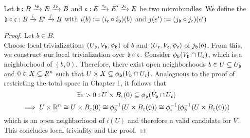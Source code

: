  \\
Let $\bundledef{\bb}{B}{E}{i_\bb}{j_\bb}$ and $\bundledef{\bc}{E}{E'}{i_\bc}{j_\bc}$ be two microbundles.
We define the  $\bundledef{\bb \circ \bc}{B}{E'}{i}{j}$ with
$i(b) := (i_\bc \circ i_\bb)(b)$ and $j(e') := (j_\bb \circ j_\bc)(e')$
\begin{proof}
Let $b \in B$. \\
Choose local trivializations $(U_\bb, V_\bb, \phi_\bb)$ of $b$ and $(U_\bc, V_\bc, \phi_\bc)$ of $j_\bb(b)$.
From this, we construct our local trivialization over $\bb \circ \bc$.
Consider $\phi_\bb(V_\bb \cap U_\bc)$, which is a neighborhood of $(b, 0)$.
Therefore, there exist open neighborhoods $b \in U \sub U_\bb$ and $0 \in X \sub R^n$ such that $U \times X \sub \phi_\bb(V_\bb \cap U_\bc)$.
Analoguous to the proof of restricting the total space in Chapter 1, it follows that
\[ \exists \varepsilon > 0: U \times B_\varepsilon(0) \sub \phi_\bb(V_\bb \cap U_\bc) \]
\[ \implies U \times \R^n \cong U \times B_\varepsilon(0) \cong \phi_\bb^{-1}(U \times B_\varepsilon(0)) \cong \phi_\bc^{-1}(\phi_\bb^{-1}(U \times B_\varepsilon(0))) \]
which is an open neighborhood of $i(U)$ and therefore a valid candidate for $V$.
This concludes local triviality and the proof.
\end{proof}